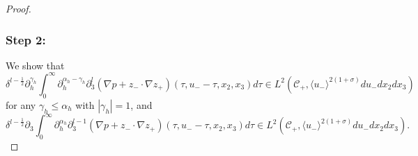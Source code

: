 \documentclass[10pt,reqno]{amsart}
\numberwithin{equation}{section}
\begin{document}
\begin{proof}
	\subsubsection*{\bf Step 2:} We show that  
	\begin{equation}\label{eq:lemma1-19}
	\delta^{l-\frac{1}{2}}\partial_h^{\gamma_h}\int_0^{\infty} \partial_h^{\alpha_h-\gamma_h}\partial_3^l(\nabla p+z_{-}\cdot\nabla z_{+}) (\tau,u_--\tau,x_2,x_3)d\tau\in L^2(\mathcal{C}_+,\langle u_-\rangle^{2(1+\sigma)}du_-dx_2dx_3)
	\end{equation}
for any $\gamma_h\leqslant\alpha_h$ with $|\gamma_h|=1$, and 
\begin{equation}\label{eq:lemma1-20}
	\delta^{l-\frac{1}{2}}\partial_3\int_0^{\infty} \partial_h^{\alpha_h}\partial_3^{l-1}(\nabla p+z_{-}\cdot\nabla z_{+}) 
	(\tau,u_--\tau,x_2,x_3)d\tau\in L^2(\mathcal{C}_+,\langle u_-\rangle^{2(1+\sigma)}du_-dx_2dx_3).
\end{equation}



\end{proof}
\end{document}
